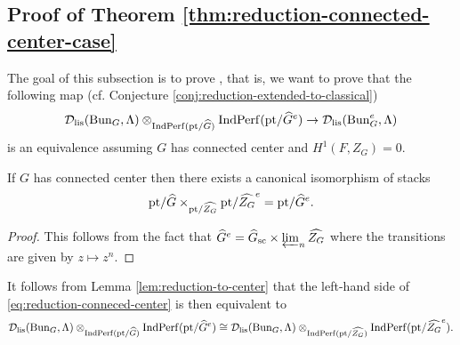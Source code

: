 \subsection{Proof of Theorem \ref{thm:reduction-connected-center-case}} \label{sec:connectedZredpf}

The goal of this subsection is to prove , that is, we want to prove that the following map (cf. Conjecture \ref{conj:reduction-extended-to-classical})
\begin{equation}\label{eq:reduction-conneced-center}
    \mathcal{D}_{\textnormal{lis}}(\mathrm{Bun}_{G},\Lambda) \otimes_{\mathrm{Ind}\mathrm{Perf}(\mathrm{pt}/\widehat{G})} \mathrm{Ind}\mathrm{Perf}(\mathrm{pt}/\widehat{G}^e) \to\mathcal{D}_{\textnormal{lis}}(\mathrm{Bun}_{G}^e,\Lambda)
\end{equation}
is an equivalence assuming $G$ has connected center and $H^1(F, Z_G) = 0$. 

\begin{lem}\label{lem:reduction-to-center}
If $G$ has connected center then there exists a canonical isomorphism of stacks 
    \begin{equation*}\label{eq:reduction-to-center}
        \mathrm{pt}/\widehat{G} \times_{\mathrm{pt}/\widehat{Z_G}} \mathrm{pt}/\widehat{Z_{G}}^e = \mathrm{pt}/\widehat{G}^e.
    \end{equation*}
\end{lem}

\begin{proof}
    This follows from the fact that $\widehat{G}^e = \widehat{G}_{\textnormal{sc}} \times \varprojlim_n \widehat{Z_G}$ where the transitions are given by $z \mapsto z^n$. 
\end{proof}

It follows from Lemma \ref{lem:reduction-to-center} that the left-hand side of \eqref{eq:reduction-conneced-center} is then equivalent to 
\begin{equation}\label{eq:reduction-connected-center-part-2}
     \mathcal{D}_{\textnormal{lis}}(\mathrm{Bun}_{G},\Lambda) \otimes_{\mathrm{Ind}\mathrm{Perf}(\mathrm{pt}/\widehat{G})} \mathrm{Ind}\mathrm{Perf}(\mathrm{pt}/\widehat{G}^e) \cong \mathcal{D}_{\textnormal{lis}}(\mathrm{Bun}_{G},\Lambda) \otimes_{\mathrm{Ind}\mathrm{Perf}(\mathrm{pt}/\widehat{Z_G})} \mathrm{Ind}\mathrm{Perf}(\mathrm{pt}/\widehat{Z_G}^e).
\end{equation}

